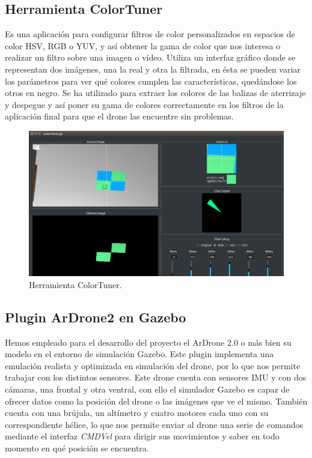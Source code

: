 \subsection{Herramienta ColorTuner}
\hspace{1cm} Es una aplicación para configurar filtros de color personalizados en espacios de color HSV, RGB o YUV, y así obtener la gama de color que nos interesa o realizar un filtro sobre una imagen o vídeo. Utiliza un interfaz gráfico donde se representan dos imágenes, una la real y otra la filtrada, en ésta se pueden variar los parámetros para ver qué colores cumplen las características, quedándose los otros en negro. Se ha utilizado para extraer los colores de las balizas de aterrizaje y despegue y así poner su gama de colores correctamente en los filtros de la aplicación final para que el drone las encuentre sin problemas.

\begin{figure}[H]
	\begin{center}
		\includegraphics[width=1\textwidth]{imag/IMG27.png}
				\caption{Herramienta ColorTuner.} 
	\label{fig:ColorTuner.}	
	\end{center}
\end{figure}

\subsection{Plugin ArDrone2 en Gazebo}
\hspace{1cm} Hemos empleado para el desarrollo del proyecto el ArDrone 2.0 o más bien su modelo en el entorno de simulación Gazebo. Este plugin implementa una emulación realista y optimizada en simulación del drone, por lo que nos permite trabajar con los distintos sensores. Este drone cuenta con sensores IMU y con dos cámaras, una frontal y otra ventral, con ello el simulador Gazebo es capaz de ofrecer datos como la posición del drone o las imágenes que ve el mismo. También cuenta con una brújula, un altímetro y cuatro motores cada uno con su correspondiente hélice, lo que nos permite enviar al drone una serie de comandos mediante el interfaz \textit{CMDVel} para dirigir sus movimientos y saber en todo momento en qué posición se encuentra.

